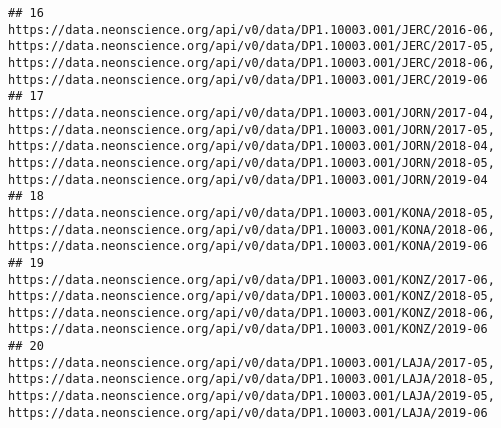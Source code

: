 \documentclass[]{book}
\begin{document}
\begin{verbatim}
## 16                                                                                                                                                                                                                                                                                                                                                          https://data.neonscience.org/api/v0/data/DP1.10003.001/JERC/2016-06, https://data.neonscience.org/api/v0/data/DP1.10003.001/JERC/2017-05, https://data.neonscience.org/api/v0/data/DP1.10003.001/JERC/2018-06, https://data.neonscience.org/api/v0/data/DP1.10003.001/JERC/2019-06
## 17                                                                                                                                                                                                                                                                                     https://data.neonscience.org/api/v0/data/DP1.10003.001/JORN/2017-04, https://data.neonscience.org/api/v0/data/DP1.10003.001/JORN/2017-05, https://data.neonscience.org/api/v0/data/DP1.10003.001/JORN/2018-04, https://data.neonscience.org/api/v0/data/DP1.10003.001/JORN/2018-05, https://data.neonscience.org/api/v0/data/DP1.10003.001/JORN/2019-04
## 18                                                                                                                                                                                                                                                                                                                                                                                                                               https://data.neonscience.org/api/v0/data/DP1.10003.001/KONA/2018-05, https://data.neonscience.org/api/v0/data/DP1.10003.001/KONA/2018-06, https://data.neonscience.org/api/v0/data/DP1.10003.001/KONA/2019-06
## 19                                                                                                                                                                                                                                                                                                                                                          https://data.neonscience.org/api/v0/data/DP1.10003.001/KONZ/2017-06, https://data.neonscience.org/api/v0/data/DP1.10003.001/KONZ/2018-05, https://data.neonscience.org/api/v0/data/DP1.10003.001/KONZ/2018-06, https://data.neonscience.org/api/v0/data/DP1.10003.001/KONZ/2019-06
## 20                                                                                                                                                                                                                                                                                                                                                          https://data.neonscience.org/api/v0/data/DP1.10003.001/LAJA/2017-05, https://data.neonscience.org/api/v0/data/DP1.10003.001/LAJA/2018-05, https://data.neonscience.org/api/v0/data/DP1.10003.001/LAJA/2019-05, https://data.neonscience.org/api/v0/data/DP1.10003.001/LAJA/2019-06

\end{verbatim}
\end{document}
